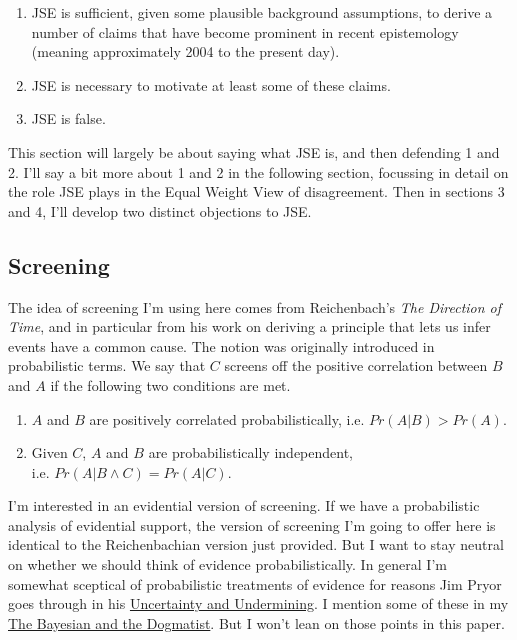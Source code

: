 \begin{enumerate}
\item JSE is sufficient, given some plausible background assumptions, to derive a number of claims that have become prominent in recent epistemology (meaning approximately 2004 to the present day).
\item JSE is necessary to motivate at least some of these claims.
\item JSE is false.
\end{enumerate}

\noindent This section will largely be about saying what JSE is, and then defending 1 and 2. I'll say a bit more about 1 and 2 in the following section, focussing in detail on the role JSE plays in the Equal Weight View of disagreement. Then in sections 3 and 4, I'll develop two distinct objections to JSE.

\subsection{Screening}

The idea of screening I'm using here comes from Reichenbach's \textit{The Direction of Time}, and in particular from his work on deriving a principle that lets us infer events have a common cause. The notion was originally introduced in probabilistic terms. We say that \(C\) screens off the positive correlation between \(B\) and \(A\) if the following two conditions are met.

\begin{enumerate}
\item \(A\) and \(B\) are positively correlated probabilistically, i.e. \(Pr(A | B) > Pr(A)\).
\item  Given \(C\), \(A\) and \(B\) are probabilistically independent, \\ i.e. \(Pr(A | B \wedge C) = Pr(A | C)\).
\end{enumerate}

\noindent I'm interested in an evidential version of screening. If we have a probabilistic analysis of evidential support, the version of screening I'm going to offer here is identical to the Reichenbachian version just provided. But I want to stay neutral on whether we should think of evidence probabilistically. In general I'm somewhat sceptical of probabilistic treatments of evidence for reasons Jim Pryor goes through in his \href{http://www.jimpryor.net/research/papers/Uncertainty.pdf}{Uncertainty and Undermining}. I mention some of these in my \href{http://brian.weatherson.org/tbatd.pdf}{The Bayesian and the Dogmatist}. But I won't lean on those points in this paper.

